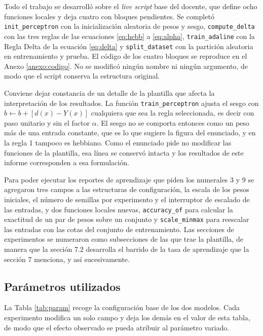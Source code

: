 \documentclass[11pt,letterpaper]{article}
\begin{document}
Todo el trabajo se desarrolló sobre el \textit{live script} base del docente, que define ocho funciones locales y deja cuatro con bloques pendientes. Se completó \texttt{init\_perceptron} con la inicialización aleatoria de pesos y sesgo, \texttt{compute\_delta} con las tres reglas de las ecuaciones \eqref{eq:hebb} a \eqref{eq:alpha}, \texttt{train\_adaline} con la Regla Delta de la ecuación \eqref{eq:delta} y \texttt{split\_dataset} con la partición aleatoria en entrenamiento y prueba. El código de los cuatro bloques se reproduce en el Anexo \ref{anexo:codigo}. No se modificó ningún nombre ni ningún argumento, de modo que el script conserva la estructura original.

Conviene dejar constancia de un detalle de la plantilla que afecta la interpretación de los resultados. La función \texttt{train\_perceptron} ajusta el sesgo con $b \leftarrow b + [d(x)-Y(x)]$ cualquiera que sea la regla seleccionada, es decir con paso unitario y sin el factor $\alpha$. El sesgo no se comporta entonces como un peso más de una entrada constante, que es lo que sugiere la figura del enunciado, y en la regla 1 tampoco es hebbiano. Como el enunciado pide no modificar las funciones de la plantilla, esa línea se conservó intacta y los resultados de este informe corresponden a esa formulación.

Para poder ejecutar los reportes de aprendizaje que piden los numerales 3 y 9 se agregaron tres campos a las estructuras de configuración, la escala de los pesos iniciales, el número de semillas por experimento y el interruptor de escalado de las entradas, y dos funciones locales nuevas, \texttt{accuracy\_of} para calcular la exactitud de un par de pesos sobre un conjunto y \texttt{scale\_minmax} para reescalar las entradas con las cotas del conjunto de entrenamiento. Las secciones de experimentos se numeraron como subsecciones de las que trae la plantilla, de manera que la sección 7.2 desarrolla el barrido de la tasa de aprendizaje que la sección 7 menciona, y así sucesivamente.

\subsection{Parámetros utilizados}

La Tabla \ref{tab:param} recoge la configuración base de los dos modelos. Cada experimento modifica un solo campo y deja los demás en el valor de esta tabla, de modo que el efecto observado se pueda atribuir al parámetro variado.
\end{document}
